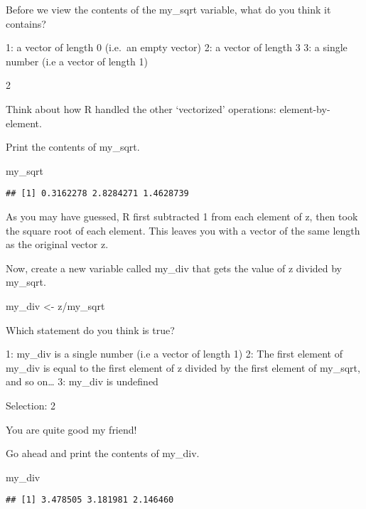 \documentclass[
]{article}
\newenvironment{Shaded}{\begin{snugshade}}{\end{snugshade}}
\newcommand{\NormalTok}[1]{#1}
\newcommand{\OtherTok}[1]{\textcolor[rgb]{0.56,0.35,0.01}{#1}}
\newcommand{\SpecialCharTok}[1]{\textcolor[rgb]{0.00,0.00,0.00}{#1}}
\begin{document}
Before we view the contents of the my\_sqrt variable, what do you think
it contains?

1: a vector of length 0 (i.e.~an empty vector) 2: a vector of length 3
3: a single number (i.e a vector of length 1)

2

Think about how R handled the other `vectorized' operations:
element-by-element.

Print the contents of my\_sqrt.

\begin{Shaded}
\begin{Highlighting}[]
\NormalTok{my\_sqrt}
\end{Highlighting}
\end{Shaded}

\begin{verbatim}
## [1] 0.3162278 2.8284271 1.4628739
\end{verbatim}

As you may have guessed, R first subtracted 1 from each element of z,
then took the square root of each element. This leaves you with a vector
of the same length as the original vector z.

Now, create a new variable called my\_div that gets the value of z
divided by my\_sqrt.

\begin{Shaded}
\begin{Highlighting}[]
\NormalTok{my\_div }\OtherTok{\textless{}{-}}\NormalTok{ z}\SpecialCharTok{/}\NormalTok{my\_sqrt}
\end{Highlighting}
\end{Shaded}

Which statement do you think is true?

1: my\_div is a single number (i.e a vector of length 1) 2: The first
element of my\_div is equal to the first element of z divided by the
first element of my\_sqrt, and so on\ldots{} 3: my\_div is undefined

Selection: 2

You are quite good my friend!

Go ahead and print the contents of my\_div.

\begin{Shaded}
\begin{Highlighting}[]
\NormalTok{my\_div}
\end{Highlighting}
\end{Shaded}

\begin{verbatim}
## [1] 3.478505 3.181981 2.146460
\end{verbatim}
\end{document}
